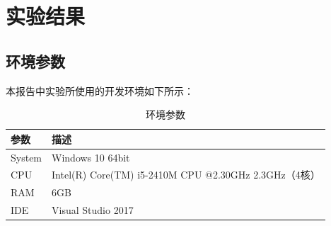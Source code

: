 \documentclass[10pt]{article}
\begin{document}
\section{实验结果}
\subsection{环境参数}
本报告中实验所使用的开发环境如下所示：
\begin{table}[H]
\caption{环境参数}
\begin{center}
\begin{tabular}{ll}
\toprule  %
参数& 描述\\
\midrule  %
System& Windows 10 64bit \\
CPU& Intel(R) Core(TM) i5-2410M CPU @2.30GHz 2.3GHz（4核）\\
RAM& 6GB\\
IDE& Visual Studio 2017 \\
\bottomrule %
\end{tabular}
\end{center}
\end{table}
\end{document}
